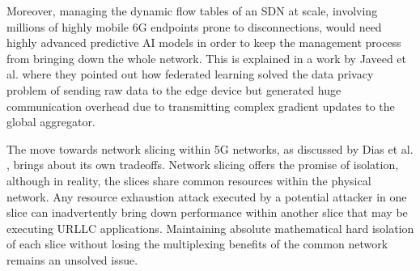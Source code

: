 \documentclass[12pt]{article}
\begin{document}
    \begin{table}[H]
        \centering
        \caption{Comparison of Scalable Security Architecture Approaches and Limitations}
        \label{tab:literature_summary}
    \end{table}

    Moreover, managing the dynamic flow tables of an SDN at scale, involving millions of highly mobile 6G endpoints prone to disconnections, would need highly advanced predictive AI models in order to keep the management process from bringing down the whole network. This is explained in a work by Javeed et al. \cite{JAVEED2024577} where they pointed out how federated learning solved the data privacy problem of sending raw data to the edge device but generated huge communication overhead due to transmitting complex gradient updates to the global aggregator.

    The move towards network slicing within 5G networks, as discussed by Dias et al. \cite{s25133940}, brings about its own tradeoffs. Network slicing offers the promise of isolation, although in reality, the slices share common resources within the physical network. Any resource exhaustion attack executed by a potential attacker in one slice can inadvertently bring down performance within another slice that may be executing URLLC applications. Maintaining absolute mathematical hard isolation of each slice without losing the multiplexing benefits of the common network remains an unsolved issue.
\end{document}
